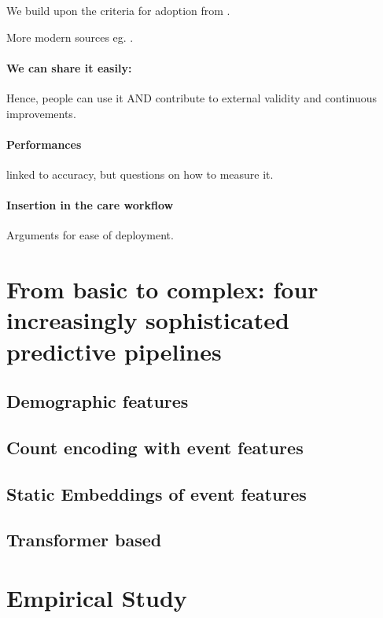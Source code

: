 \documentclass{report}
\begin{document}
We build upon the criteria for adoption from \cite{wyatt1995commentary}.

More modern sources eg. \cite{subbaswamy2020development}.

\paragraph{We can share it easily: } Hence, people can use it AND contribute to
external validity and continuous improvements.

\paragraph{Performances} linked to accuracy, but questions on how to measure it.

\paragraph{Insertion in the care workflow}

Arguments for ease of deployment.

\section{From basic to complex: four increasingly sophisticated predictive pipelines}\label{sec:predictive_models:pipelines}

\subsection{Demographic features}\label{subsec:predictive_models:demographic}

\subsection{Count encoding with event features}\label{subsec:predictive_models:count_encoding}

\subsection{Static Embeddings of event features}

\subsection{Transformer based}\label{subsec:predictive_models:transformer}

\section{Empirical Study}\label{sec:predictive_models:empirical_study}
\end{document}

